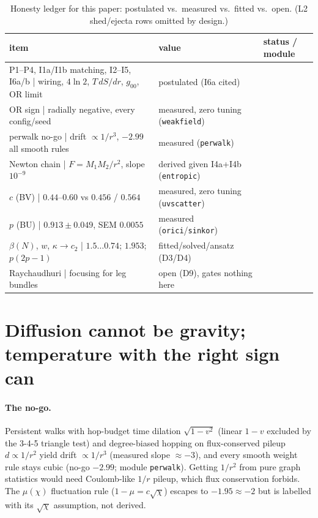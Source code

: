 \documentclass[11pt]{article}
\begin{document}
\begin{table}[ht]\centering\small
\caption{Honesty ledger for this paper: postulated vs.\ measured vs.\ fitted vs.\ open. (L2 shed/ejecta rows omitted by design.)}
\label{tab:ledger}
\begin{tabular}{@{}l p{7.2cm} p{4.4cm}@{}}\toprule
item & value & status / module \\\midrule
P1--P4, I1a/I1b matching, I2--I5, I6a/b | wiring, $4\ln 2$, $T\,dS/dr$, $g_{00}$, OR limit & postulated (I6a cited) \\
OR sign | radially negative, every config/seed & measured, zero tuning (\texttt{weakfield}) \\
perwalk no-go | drift $\propto 1/r^3$, $-2.99$ all smooth rules & measured (\texttt{perwalk}) \\
Newton chain | $F = M_1M_2/r^2$, slope $10^{-9}$ & derived given I4a+I4b (\texttt{entropic}) \\
$c$ (BV) | $0.44$--$0.60$ vs $0.456$ / $0.564$ & measured, zero tuning (\texttt{uvscatter}) \\
$p$ (BU) | $0.913 \pm 0.049$, SEM $0.0055$ & measured (\texttt{orici}/\texttt{sinkor}) \\
$\beta(N)$, $w$, $\kappa\to c_2$ | $1.5\ldots0.74$; $1.953$; $p(2p-1)$ & fitted/solved/ansatz (D3/D4) \\
Raychaudhuri | focusing for leg bundles & open (D9), gates nothing here \\\bottomrule
\end{tabular}
\end{table}

\section{Diffusion cannot be gravity; temperature with the right sign can}
\label{sec:newton}

\paragraph{The no-go.} Persistent walks with hop-budget time dilation $\sqrt{1-v^2}$ (linear $1-v$ excluded by the 3-4-5 triangle test) and degree-biased hopping on flux-conserved pileup $d \propto 1/r^2$ yield drift $\propto 1/r^3$ (measured slope $\approx -3$), and every smooth weight rule stays cubic (no-go $-2.99$; module \texttt{perwalk}). Getting $1/r^2$ from pure graph statistics would need Coulomb-like $1/r$ pileup, which flux conservation forbids. The $\mu(\chi)$ fluctuation rule ($1-\mu = c\sqrt{\chi}$) escapes to $-1.95 \approx -2$ but is labelled with its $\sqrt{\chi}$ assumption, not derived.
\end{document}
